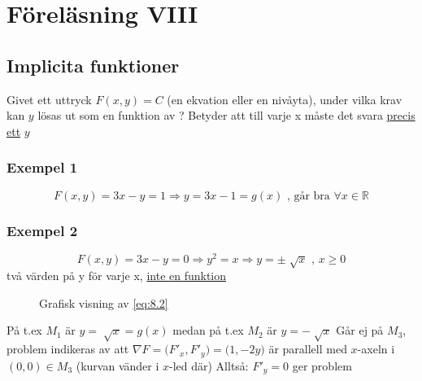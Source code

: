 \documentclass[a4paper]{article}
\let\oldsqrt\sqrt
\renewcommand*{\sqrt}[2][\ ]{\oldsqrt[#1]{#2} }
\begin{document}
\newpage
\section{Föreläsning VIII}
\subsection{Implicita funktioner}

Givet ett uttryck \(F(x,y)=C\) (en ekvation eller en nivåyta), under vilka krav kan \(y\) lösas ut som en funktion av ? \newline
Betyder att till varje x måste det svara \underline{precis ett} \(y\)

\subsubsection{Exempel 1}
\begin{equation} \label{eq:8.1}
	F(x,y) = 3x-y = 1 \Rightarrow y = 3x-1 = g(x) \text{ , går bra } \forall x \in \mathbb{R}
\end{equation}

\subsubsection{Exempel 2}
\begin{equation} \label{eq:8.2}
	F(x,y) = 3x-y = 0 \Rightarrow y^2 = x \Rightarrow y = \pm \sqrt{x} \text{ , } x \geq 0
\end{equation}
två värden på y för varje x, \underline{inte en funktion}

\begin{figure}[ht] 
  \caption{Grafisk visning av \eqref{eq:8.2}} \label{fig:8.1}
\end{figure}

På t.ex \(M_1\) är \(y = \sqrt{x} = g(x)\) medan på t.ex \(M_2\) är \(y = -\sqrt{x}\) \newline
Går ej på \(M_3\), problem indikeras av att \(\nabla F = \Big(F'_x,F'_y\Big) = \Big(1,-2y\Big)\) är parallell med \(x\)-axeln i \((0,0) \in M_3\) (kurvan vänder i \(x\)-led där) \newline
Alltså: \(F'_y = 0\) ger problem
\end{document}
